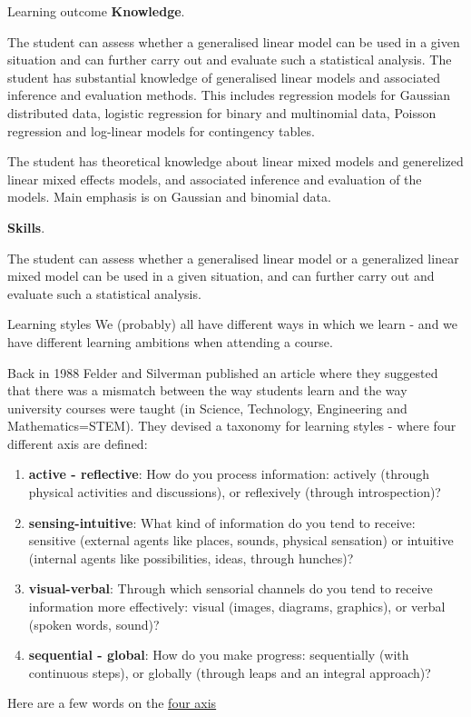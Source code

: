 \documentclass[
  ignorenonframetext,
]{beamer}
\begin{document}
\begin{frame}{Learning outcome}
\protect\hypertarget{learning-outcome}{}
\textbf{Knowledge}.

The student can assess whether a generalised linear model can be used in
a given situation and can further carry out and evaluate such a
statistical analysis. The student has substantial knowledge of
generalised linear models and associated inference and evaluation
methods. This includes regression models for Gaussian distributed data,
logistic regression for binary and multinomial data, Poisson regression
and log-linear models for contingency tables.

The student has theoretical knowledge about linear mixed models and
generelized linear mixed effects models, and associated inference and
evaluation of the models. Main emphasis is on Gaussian and binomial
data.

\textbf{Skills}.

The student can assess whether a generalised linear model or a
generalized linear mixed model can be used in a given situation, and can
further carry out and evaluate such a statistical analysis.
\end{frame}

\begin{frame}{Learning styles}
\protect\hypertarget{learning-styles}{}
We (probably) all have different ways in which we learn - and we have
different learning ambitions when attending a course.

Back in 1988 Felder and Silverman published an article where they
suggested that there was a mismatch between the way students learn and
the way university courses were taught (in Science, Technology,
Engineering and Mathematics=STEM). They devised a taxonomy for learning
styles - where four different axis are defined:
\end{frame}

\begin{frame}
\begin{enumerate}
[1)]
\item
  \textbf{active - reflective}: How do you process information: actively
  (through physical activities and discussions), or reflexively (through
  introspection)?
\item
  \textbf{sensing-intuitive}: What kind of information do you tend to
  receive: sensitive (external agents like places, sounds, physical
  sensation) or intuitive (internal agents like possibilities, ideas,
  through hunches)?
\item
  \textbf{visual-verbal}: Through which sensorial channels do you tend
  to receive information more effectively: visual (images, diagrams,
  graphics), or verbal (spoken words, sound)?
\item
  \textbf{sequential - global}: How do you make progress: sequentially
  (with continuous steps), or globally (through leaps and an integral
  approach)?
\end{enumerate}

Here are a few words on the
\href{http://www4.ncsu.edu/unity/lockers/users/f/felder/public//ILSdir/styles.pdf}{four
axis}
\end{frame}
\end{document}
